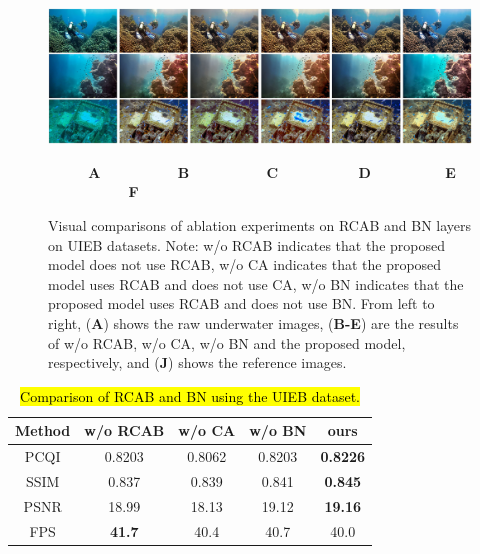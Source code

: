 \documentclass[utf8]{FrontiersinHarvard} %
\begin{document}
\begin{figure}[htbp]
\begin{center}
\includegraphics[width=1\textwidth]{FSpiralGAN_frontiers/onepicture/abalation_BN300.jpg}
\end{center}
$~~~~~~~~~~~~~$\textbf{A}$~~~~~~~~~~~~~~~~~~~~~~~~~$\textbf{B}$~~~~~~~~~~~~~~~~~~~~~~~~~$\textbf{C}$~~~~~~~~~~~~~~~~~~~~~~~~~~$\textbf{D}$~~~~~~~~~~~~~~~~~~~~~~~~$\textbf{E}$~~~~~~~~~~~~~~~~~~~~~~~~~~$\textbf{F}
 \caption{Visual comparisons of ablation experiments on RCAB and BN layers on UIEB datasets. Note: w/o RCAB indicates that the proposed model does not use RCAB, w/o CA indicates that the proposed model uses RCAB and does not use CA, w/o BN indicates that the proposed model uses RCAB and does not use BN. From left to right, (\textbf{A}) shows the raw underwater images, (\textbf{B-E}) are the results of w/o RCAB, w/o CA, w/o BN and the proposed model, respectively, and (\textbf{J}) shows the reference images. \label{fig:ablationRCABandBN-UIEBD}}
\end{figure}

\begin{table}[htbp]\normalsize
\centering
\setlength\tabcolsep{7pt}
\caption{\hl{Comparison of RCAB and BN using the UIEB dataset.}}
\begin{tabular}{c|cccc}
\hline  
Method&w/o RCAB&w/o CA&w/o BN&ours\\
\hline 
PCQI&0.8203&0.8062&0.8203&\textbf{0.8226}\\
\hline
SSIM&0.837&0.839&0.841&\textbf{0.845}\\ 
\hline
PSNR&18.99&18.13&19.12&\textbf{19.16}\\
\hline 
FPS&\textbf{41.7}&40.4&40.7&40.0\\
\hline
\end{tabular}
\label{tbl:ablationRCABandBN-UIEBD}
\end{table}
\end{document}
